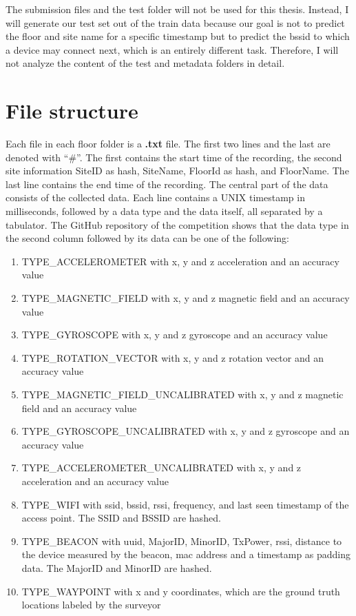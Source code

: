 The submission files and the test folder will not be used for this thesis.
Instead, I will generate our test set out of the train data because our goal is not to predict the floor and site name for a specific timestamp but to predict the \ac{bssid} to which a device may connect next, which is an entirely different task.
Therefore, I will not analyze the content of the test and metadata folders in detail.


\section{File structure}\label{sec:file-structure}

Each file in each floor folder is a \textbf{.txt} file. 
The first two lines and the last are denoted with ``\#''.
The first contains the start time of the recording, the second site information SiteID as hash, SiteName, FloorId as hash, and FloorName.
The last line contains the end time of the recording.
The central part of the data consists of the collected data. 
Each line contains a UNIX timestamp in milliseconds, followed by a data type and the data itself, all separated by a tabulator.
The GitHub repository of the competition \cite{GitHubComp} shows that the data type in the second column followed by its data can be one of the following:

\begin{enumerate}
    \item\label{type:acce} TYPE\_ACCELEROMETER with x, y and z acceleration and an accuracy value
    \item\label{type:mag} TYPE\_MAGNETIC\_FIELD with x, y and z magnetic field and an accuracy value
    \item\label{type:gyro} TYPE\_GYROSCOPE with x, y and z gyroscope and an accuracy value
    \item\label{type:rot} TYPE\_ROTATION\_VECTOR with x, y and z rotation vector and an accuracy value
    \item\label{type:mag_u} TYPE\_MAGNETIC\_FIELD\_UNCALIBRATED with x, y and z magnetic field and an accuracy value
    \item\label{type:gyro_u} TYPE\_GYROSCOPE\_UNCALIBRATED with x, y and z gyroscope and an accuracy value
    \item\label{type:acce_u} TYPE\_ACCELEROMETER\_UNCALIBRATED with x, y and z acceleration and an accuracy value
    \item\label{type:wifi} TYPE\_WIFI with \ac{ssid}, \ac{bssid}, \ac{rssi}, frequency, and last seen timestamp of the access point. The SSID and BSSID are hashed.
    \item\label{type:beacon} TYPE\_BEACON with \ac{uuid}, \ac{MajorID}, \ac{MinorID}, \ac{TxPower}, \ac{rssi}, distance to the device measured by the beacon, \ac{mac} address and a timestamp as padding data. The MajorID and MinorID are hashed.
    \item\label{type:way} TYPE\_WAYPOINT with x and y coordinates, which are the ground truth locations labeled by the surveyor
\end{enumerate}

